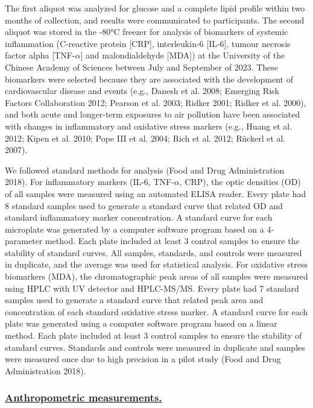 \documentclass[
  letterpaper,
  DIV=11,
  numbers=noendperiod]{scrartcl}
\providecommand{\DIFadd}[1]{{\protect\color{blue}\underline{#1}}} %
\providecommand{\DIFaddbegin}{} %
\providecommand{\DIFaddend}{} %
\providecommand{\DIFdelbegin}{} %
\providecommand{\DIFdelend}{} %
\newcommand{\DIFscaledelfig}{0.5}
\newlength{\DIFdelgraphicswidth} %
\newlength{\DIFdelgraphicsheight} %
\newcommand{\DIFaddincludegraphics}[2][]{{\color{blue}\fbox{\DIFOincludegraphics[#1]{#2}}}} %
\newcommand{\DIFdelincludegraphics}[2][]{%
\sbox{\DIFdelgraphicsbox}{\DIFOincludegraphics[#1]{#2}}%
\settoboxwidth{\DIFdelgraphicswidth}{\DIFdelgraphicsbox} %
\settoboxtotalheight{\DIFdelgraphicsheight}{\DIFdelgraphicsbox} %
\scalebox{\DIFscaledelfig}{%
\parbox[b]{\DIFdelgraphicswidth}{\usebox{\DIFdelgraphicsbox}\\[-\baselineskip] \rule{\DIFdelgraphicswidth}{0em}}\llap{\resizebox{\DIFdelgraphicswidth}{\DIFdelgraphicsheight}{%
\setlength{\unitlength}{\DIFdelgraphicswidth}%
\begin{picture}(1,1)%
\thicklines\linethickness{2pt} %
{\color[rgb]{1,0,0}\put(0,0){\framebox(1,1){}}}%
{\color[rgb]{1,0,0}\put(0,0){\line( 1,1){1}}}%
{\color[rgb]{1,0,0}\put(0,1){\line(1,-1){1}}}%
\end{picture}%
}\hspace*{3pt}}} %
} %
\DeclareRobustCommand{\DIFaddbegin}{\DIFOaddbegin \let\includegraphics\DIFaddincludegraphics} %
\DeclareRobustCommand{\DIFaddend}{\DIFOaddend \let\includegraphics\DIFOincludegraphics} %
\DeclareRobustCommand{\DIFdelbegin}{\DIFOdelbegin \let\includegraphics\DIFdelincludegraphics} %
\DeclareRobustCommand{\DIFdelend}{\DIFOaddend \let\includegraphics\DIFOincludegraphics} %
\begin{document}
The first aliquot was analyzed for glucose and a complete lipid profile
within two months of collection, and results were communicated to
participants. The second aliquot was stored in the -80°C freezer for
analysis of biomarkers of systemic inflammation (C-reactive protein
{[}CRP{]}, interleukin-6 {[}IL-6{]}, tumour necrosis factor alpha
{[}TNF-\(\alpha\){]} and malondialdehyde {[}MDA{]}) at the University of
the Chinese Academy of Sciences between July and September of 2023.
These biomarkers were selected because they are associated with the
development of cardiovascular disease and events (e.g., Danesh et al.
2008; Emerging Risk Factors Collaboration 2012; Pearson et al. 2003;
Ridker 2001; Ridker et al. 2000), and both acute and longer-term
exposures to air pollution have been associated with changes in
inflammatory and oxidative stress markers (e.g., Huang et al. 2012;
Kipen et al. 2010; Pope III et al. 2004; Rich et al. 2012; Rückerl et
al. 2007).

We followed standard methods for analysis (Food and Drug Administration
2018). For inflammatory markers (IL-6, TNF-\(\alpha\), CRP), the optic
densities (OD) of all samples were measured using an automated ELISA
reader. Every plate had 8 standard samples used to generate a standard
curve that related OD and standard inflammatory marker concentration. A
standard curve for each microplate was generated by a computer software
program based on a 4-parameter method. Each plate included at least 3
control samples to ensure the stability of standard curves. All samples,
standards, and controls were measured in duplicate, and the average was
used for statistical analysis. For oxidative stress biomarkers (MDA),
the chromatographic peak areas of all samples were measured using HPLC
with UV detector and HPLC-MS/MS. Every plate had 7 standard samples used
to generate a standard curve that related peak area and concentration of
each standard oxidative stress marker. A standard curve for each plate
was generated using a computer software program based on a linear
method. Each plate included at least 3 control samples to ensure the
stability of standard curves. Standards and controls were measured in
duplicate and samples were measured once due to high precision in a
pilot study (Food and Drug Administration 2018).

\DIFdelbegin %
\DIFdelend \DIFaddbegin \subsubsection{\DIFadd{Anthropometric
measurements.}}\label{anthropometric-measurements.}
\DIFaddend 
\end{document}
